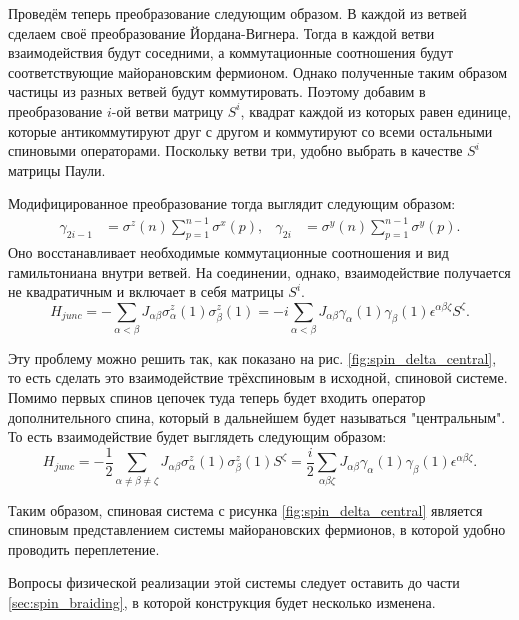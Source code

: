 \documentclass[a4paper,12pt]{article}
\theoremstyle{plain} %
\theoremstyle{definition} %
\theoremstyle{remark} %
\begin{document}
Проведём теперь преобразование следующим образом. В каждой из ветвей сделаем своё преобразование Йордана-Вигнера. Тогда в каждой ветви взаимодействия будут соседними, а коммутационные соотношения будут соответствующие майорановским фермионом. Однако полученные таким образом частицы из разных ветвей будут коммутировать. Поэтому добавим в преобразование $i$-ой ветви матрицу $S^i$, квадрат каждой из которых равен единице, которые антикоммутируют друг с другом и коммутируют со всеми остальными спиновыми операторами. Поскольку ветви три, удобно выбрать в качестве $S^i$ матрицы Паули.

Модифицированное преобразование тогда выглядит следующим образом:
\begin{align}
    \gamma_{2i-1} &= \sigma^z (n) \sum\limits_{p=1}^{n-1} \sigma^x (p), & 
    \gamma_{2i} &= \sigma^y (n) \sum\limits_{p=1}^{n-1} \sigma^y (p).
\end{align}
Оно восстанавливает необходимые коммутационные соотношения и вид гамильтониана внутри ветвей. На соединении, однако, взаимодействие получается не квадратичным и включает в себя матрицы $S^i$.
\begin{equation}
    H_{junc} = - \sum\limits_{\alpha < \beta} J_{\alpha \beta} \sigma_\alpha^z (1) \sigma_\beta^z (1) = - i \sum\limits_{\alpha < \beta} J_{\alpha \beta} \gamma_\alpha (1) \gamma_\beta (1) \epsilon^{\alpha \beta \zeta} S^\zeta.
\end{equation}

Эту проблему можно решить так, как показано на рис. \ref{fig:spin_delta_central}, то есть сделать это взаимодействие трёхспиновым в исходной, спиновой системе. Помимо первых спинов цепочек туда теперь будет входить оператор дополнительного спина, который в дальнейшем будет называться "центральным"$ $. То есть взаимодействие будет выглядеть следующим образом:
\begin{equation}
    H_{junc} = - \frac{1}{2} \sum\limits_{\alpha \neq \beta \neq \zeta} J_{\alpha \beta} \sigma_\alpha^z (1) \sigma_\beta^z (1) S^\zeta = \frac{i}{2} \sum\limits_{\alpha \beta \zeta} J_{\alpha \beta} \gamma_\alpha (1) \gamma_\beta (1) \epsilon^{\alpha \beta \zeta}.
    \label{eq:junc_H}
\end{equation}

Таким образом, спиновая система с рисунка \ref{fig:spin_delta_central} является спиновым представлением системы майорановских фермионов, в которой удобно проводить переплетение.

Вопросы физической реализации этой системы следует оставить до части \ref{sec:spin_braiding}, в которой конструкция будет несколько изменена. 
\end{document}
